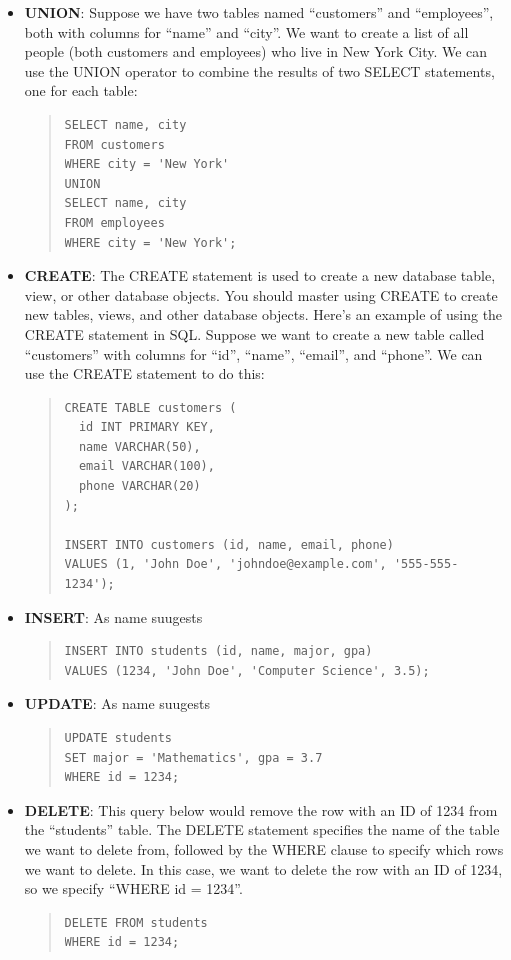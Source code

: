 \documentclass[11pt]{article}
\begin{document}
\begin{itemize}
\item \textbf{UNION}:  Suppose we have two tables named “customers” and “employees”, both with columns for “name” and “city”. We want to create a list of all people (both customers and employees) who live in New York City. We can use the UNION operator to combine the results of two SELECT statements, one for each table:
\begin{quote}
\begin{verbatim}
SELECT name, city
FROM customers
WHERE city = 'New York'
UNION
SELECT name, city
FROM employees
WHERE city = 'New York';
\end{verbatim}
\end{quote}


\item \textbf{CREATE}:  The CREATE statement is used to create a new database table, view, or other database objects. You should master using CREATE to create new tables, views, and other database objects. Here’s an example of using the CREATE statement in SQL. Suppose we want to create a new table called “customers” with columns for “id”, “name”, “email”, and “phone”. We can use the CREATE statement to do this:
\begin{quote}
\begin{verbatim}
CREATE TABLE customers (
  id INT PRIMARY KEY,
  name VARCHAR(50),
  email VARCHAR(100),
  phone VARCHAR(20)
);

INSERT INTO customers (id, name, email, phone)
VALUES (1, 'John Doe', 'johndoe@example.com', '555-555-1234');
\end{verbatim}
\end{quote}


\item \textbf{INSERT}:  As name suugests
\begin{quote}
\begin{verbatim}
INSERT INTO students (id, name, major, gpa)
VALUES (1234, 'John Doe', 'Computer Science', 3.5);
\end{verbatim}
\end{quote}


\item \textbf{UPDATE}:  As name suugests
\begin{quote}
\begin{verbatim}
UPDATE students
SET major = 'Mathematics', gpa = 3.7
WHERE id = 1234;
\end{verbatim}
\end{quote}


\item \textbf{DELETE}:  This query below would remove the row with an ID of 1234 from the “students” table. The DELETE statement specifies the name of the table we want to delete from, followed by the WHERE clause to specify which rows we want to delete. In this case, we want to delete the row with an ID of 1234, so we specify “WHERE id = 1234”.
\begin{quote}
\begin{verbatim}
DELETE FROM students
WHERE id = 1234;
\end{verbatim}
\end{quote}



\end{itemize}
\end{document}
